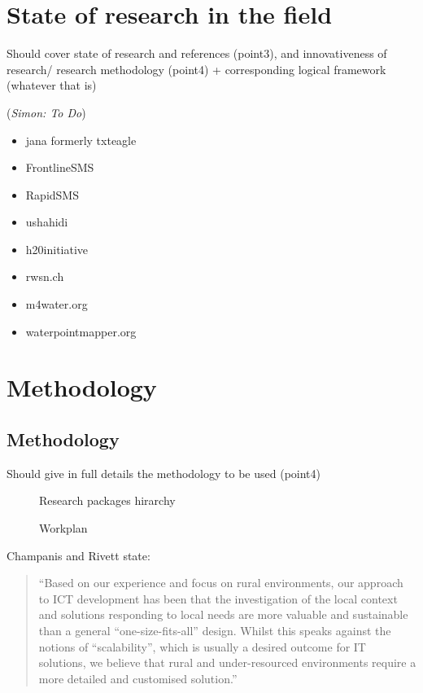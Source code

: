 \documentclass[11pt]{article}
\newcommand{\simon}[1]{\vspace{1em}(\emph{Simon: #1})\vspace{1em}}
\begin{document}
\section{State of research in the field}\label{state_of_research}
Should cover state of research and references (point3), and innovativeness of research/ research methodology (point4) + corresponding logical framework (whatever that is)

\simon{To Do}

\begin{itemize}
 \item jana formerly txteagle
 \item FrontlineSMS
 \item RapidSMS
 \item ushahidi
 \item h20initiative
 \item rwsn.ch
 \item m4water.org
 \item waterpointmapper.org
\end{itemize}


\section{Methodology}\label{methodology}
\subsection{Methodology}\label{metho}
Should give in full details the methodology to be used (point4)

\begin{figure}
\begin{center}
 
\end{center}
\caption{Research packages hirarchy}
\label{tikz:researchpackages}
\end{figure} 

\begin{figure}
\begin{center}
 
\end{center}
\caption{Workplan}
\label{tikz:workplan}
\end{figure} 

Champanis and Rivett \cite{champanis2012reporting} state: \begin{quote}
``Based on our experience and focus on rural environments, our
approach to ICT development has been that the investigation of
the local context and solutions responding to local needs are more
valuable and sustainable than a general “one-size-fits-all” design.
Whilst this speaks against the notions of “scalability”, which is
usually a desired outcome for IT solutions, we believe that rural
and under-resourced environments require a more detailed and
customised solution.''\end{quote} 
\end{document}
